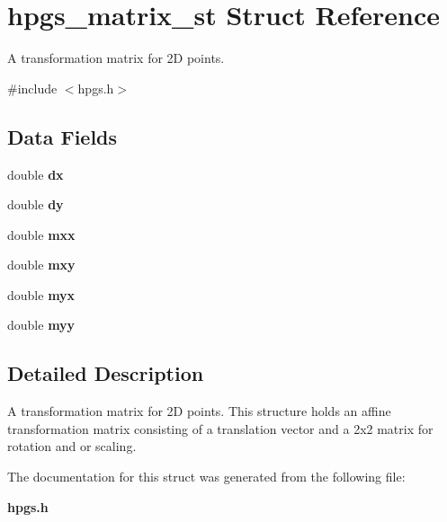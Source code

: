 \section{hpgs\_\-matrix\_\-st Struct Reference}
\label{structhpgs__matrix__st}


A transformation matrix for 2D points.  




{\ttfamily \#include $<$hpgs.h$>$}

\subsection*{Data Fields}
\begin{DoxyCompactItemize}
\item 
double {\bfseries dx}\label{structhpgs__matrix__st_a97c0424c4d0380528e0ae7c0b2c9181a}

\item 
double {\bfseries dy}\label{structhpgs__matrix__st_a979e45531c6d72be71478efe48385596}

\item 
double {\bfseries mxx}\label{structhpgs__matrix__st_a1d48e919c1f8dce2636e3dbfedcfd244}

\item 
double {\bfseries mxy}\label{structhpgs__matrix__st_a8917fe3c7b236ef57d18151810658eac}

\item 
double {\bfseries myx}\label{structhpgs__matrix__st_a7c0648d4a5def84a2cbc604bdac6f61c}

\item 
double {\bfseries myy}\label{structhpgs__matrix__st_a5d5b38c054b1f426aaed1579b0fcf887}

\end{DoxyCompactItemize}


\subsection{Detailed Description}
A transformation matrix for 2D points. This structure holds an affine transformation matrix consisting of a translation vector and a 2x2 matrix for rotation and or scaling. 

The documentation for this struct was generated from the following file:\begin{DoxyCompactItemize}
\item 
{\bf hpgs.h}\end{DoxyCompactItemize}
